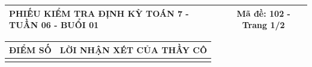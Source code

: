 \documentclass[12pt,a4paper]{article}
\begin{document}
\newpage

\noindent
\begin{tabularx}{\linewidth}{|X|c|}
\hline
\textbf{PHIẾU KIỂM TRA ĐỊNH KỲ TOÁN 7 - TUẦN 06 - BUỔI 01} & \textbf{Mã đề: 102 - Trang 1/2} \\
\hline
\end{tabularx}

\vspace{1.0mm}

\noindent
\begin{tabularx}{\linewidth}{|p{3.2cm}|X|}
\hline
\centering\textbf{ĐIỂM SỐ} & \centering\textbf{LỜI NHẬN XÉT CỦA THẦY CÔ} \tabularnewline
\hline
\rule{0pt}{1.8cm} & \tabularnewline
\hline
\end{tabularx}
\end{document}
